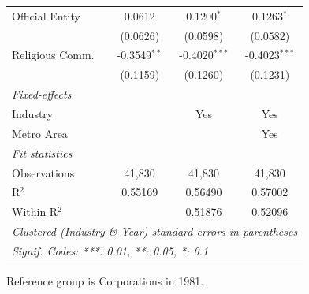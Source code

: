 \documentclass[
  12pt]{article}
\theoremstyle{definition}
\theoremstyle{remark}
\begin{document}
\begin{table}
\begin{minipage}{\linewidth}
\begin{tabular}{lccc}
   Official Entity   & 0.0612         & 0.1200$^{*}$    & 0.1263$^{*}$\\   
                     & (0.0626)       & (0.0598)        & (0.0582)\\   
   Religious Comm.   & -0.3549$^{**}$ & -0.4020$^{***}$ & -0.4023$^{***}$\\   
                     & (0.1159)       & (0.1260)        & (0.1231)\\   
   \midrule
   \emph{Fixed-effects}\\
   Industry          &                & Yes             & Yes\\  
   Metro Area        &                &                 & Yes\\  
   \midrule
   \emph{Fit statistics}\\
   Observations      & 41,830         & 41,830          & 41,830\\  
   R$^2$             & 0.55169        & 0.56490         & 0.57002\\  
   Within R$^2$      &                & 0.51876         & 0.52096\\  
   \midrule \midrule
   \multicolumn{4}{l}{\emph{Clustered (Industry \& Year) standard-errors in parentheses}}\\
   \multicolumn{4}{l}{\emph{Signif. Codes: ***: 0.01, **: 0.05, *: 0.1}}\\
\end{tabular}

\end{minipage}%
\newline
\begin{minipage}{\linewidth}

\par \raggedright

\end{minipage}%
\newline
\begin{minipage}{\linewidth}

Reference group is Corporations in 1981.

\end{minipage}%
\newline
\begin{minipage}{\linewidth}

\par\endgroup

\end{minipage}%

\end{table}%
\end{document}
